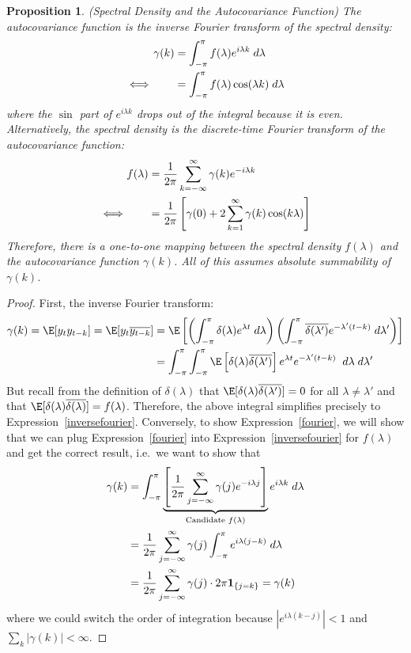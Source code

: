 \documentclass[12pt]{article}
\theoremstyle{plain}
\newtheorem{prop}[thm]{Proposition}
\theoremstyle{definition}
\theoremstyle{remark}
\begin{document}
\begin{prop}\emph{(Spectral Density and the Autocovariance Function)}
The autocovariance function is the inverse Fourier transform of the
spectral density:
\begin{align}
  \gamma(k)
  &= \int_{-\pi}^\pi f(\lambda)e^{i\lambda k}\;d\lambda
  \label{inversefourier}
  \\
  \iff\qquad
  &= \int_{-\pi}^\pi f(\lambda)\cos(\lambda k)\;d\lambda
  \notag
\end{align}
where the $\sin$ part of $e^{i\lambda k}$ drops out of the integral
because it is even. Alternatively, the spectral density is the
discrete-time Fourier transform of the autocovariance function:
\begin{align}
  f(\lambda)
  &= \frac{1}{2\pi} \sum_{k=-\infty}^\infty
  \gamma(k) e^{-i\lambda k}
  \label{fourier}
  \\
  \iff\qquad
  &= \frac{1}{2\pi}
  \left[
    \gamma(0) + 2\sum_{k=1}^\infty \gamma(k)\cos(k\lambda)
  \right]
  \notag
\end{align}
Therefore, there is a one-to-one mapping between the spectral density
$f(\lambda)$ and the autocovariance function $\gamma(k)$.
All of this assumes absolute summability of $\gamma(k)$.
\end{prop}
\begin{proof}
First, the inverse Fourier transform:
\begin{align*}
  \gamma(k)=
  \E[y_ty_{t-k}] =
  \E[y_t\overline{y_{t-k}}]
  &=
  \E\left[
    \left(
    \int_{-\pi}^\pi \delta(\lambda)e^{\lambda t} \; d\lambda
    \right)
    \left(
    \int_{-\pi}^\pi \overline{\delta(\lambda')}e^{-\lambda' (t-k)} \;
    d\lambda'
    \right)
  \right]
  \\
  &=
  \int_{-\pi}^\pi \int_{-\pi}^\pi
  \E\left[
    \delta(\lambda) \overline{\delta(\lambda')}
  \right]
  e^{\lambda t}e^{-\lambda' (t-k)} \;
  \; d\lambda \; d\lambda'
\end{align*}
But recall from the definition of $\delta(\lambda)$ that
$\E[\delta(\lambda)\overline{\delta(\lambda')}]=0$ for all
$\lambda\neq\lambda'$ and that
$\E[\delta(\lambda)\overline{\delta(\lambda)}]=f(\lambda)$.
Therefore, the above integral simplifies precisely to
Expression~\ref{inversefourier}.
Conversely, to show Expression~\ref{fourier}, we will show that
we can plug Expression~\ref{fourier} into
Expression~\ref{inversefourier} for $f(\lambda)$ and get the correct
result, i.e.\ we want to show that
\begin{align*}
  \gamma(k)
  &= \int_{-\pi}^\pi
  \underbrace{%
  \left[
  \frac{1}{2\pi} \sum_{j=-\infty}^\infty
  \gamma(j) e^{-i\lambda j}
  \right]
  }_{\text{Candidate $f(\lambda)$}}
  e^{i\lambda k}\;d\lambda \\
  &= \frac{1}{2\pi}
  \sum_{j=-\infty}^\infty
  \gamma(j)
  \int_{-\pi}^\pi
  e^{i\lambda (j-k)}
  \;d\lambda
  \\
  &= \frac{1}{2\pi}
  \sum_{j=-\infty}^\infty
  \gamma(j)
  \cdot2\pi \mathbf{1}_{\{j=k\}}
  =\gamma(k)
\end{align*}
where we could switch the order of integration because
$|e^{i\lambda (k-j)}|<1$ and $\sum_k|\gamma(k)|<\infty$.
\end{proof}
\end{document}
